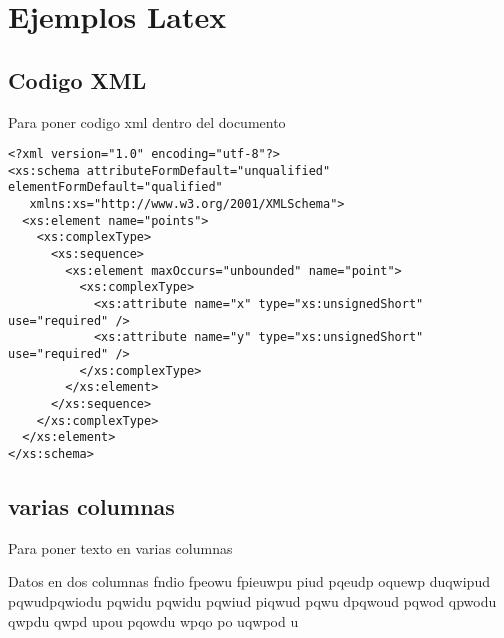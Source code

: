 
\chapter{Ejemplos Latex} %

\label{EjemplosLatex} %



\section{Codigo XML}


Para poner codigo xml dentro del documento


\begin{lstlisting}
<?xml version="1.0" encoding="utf-8"?>
<xs:schema attributeFormDefault="unqualified" elementFormDefault="qualified"
   xmlns:xs="http://www.w3.org/2001/XMLSchema">
  <xs:element name="points">
    <xs:complexType>
      <xs:sequence>
        <xs:element maxOccurs="unbounded" name="point">
          <xs:complexType>
            <xs:attribute name="x" type="xs:unsignedShort" use="required" />
            <xs:attribute name="y" type="xs:unsignedShort" use="required" />
          </xs:complexType>
        </xs:element>
      </xs:sequence>
    </xs:complexType>
  </xs:element>
</xs:schema>
\end{lstlisting}

\section{varias columnas}

Para poner texto en varias columnas

\begin{multicols}{2}
 Datos en dos columnas fndio fpeowu fpieuwpu piud pqeudp oquewp duqwipud
 pqwudpqwiodu pqwidu pqwidu pqwiud piqwud pqwu dpqwoud pqwod qpwodu qwpdu
 qwpd upou pqowdu wpqo po uqwpod u
\end{multicols}
